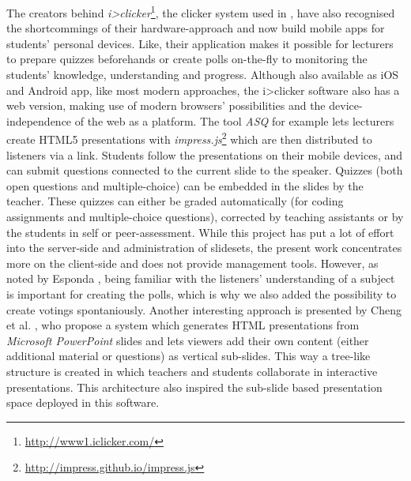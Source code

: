 The creators behind \emph{i>clicker}\footnote{\url{http://www1.iclicker.com/}}, the clicker system used in \cite{Chamillard:StudentResponseSystem}, have also recognised the shortcommings of their hardware-approach and now build mobile apps for students' personal devices. Like\cite{Esponda:ElectronicVotingOnTheFly}, their application makes it possible for lecturers to prepare quizzes beforehands or create polls on-the-fly to monitoring the students' knowledge, understanding and progress. Although also available as iOS and Android app, like most modern approaches, the i>clicker software also has a web version, making use of modern browsers' possibilities and the device-independence of the web as a platform.
The tool \emph{ASQ} \cite{Triglianos:InteractiveWebPresentationsImpress} for example lets lecturers create HTML5 presentations with \emph{impress.js}\footnote{\url{http://impress.github.io/impress.js}} which are then distributed to listeners via a link. Students follow the presentations on their mobile devices, and can submit questions connected to the current slide to the speaker. Quizzes (both open questions and multiple-choice) can be embedded in the slides by the teacher. These quizzes can either be graded automatically (for coding assignments and multiple-choice questions), corrected by teaching assistants or by the students in self or peer-assessment. While this project has put a lot of effort into the server-side and administration of slidesets, the present work concentrates more on the client-side and does not provide management tools. However, as noted by Esponda \cite{Esponda:ElectronicVotingOnTheFly}, being familiar with the listeners' understanding of a subject is important for creating the polls, which is why we also added the possibility to create votings spontaniously.
Another interesting approach is presented by Cheng et al. \cite{Cheng:TreebasedOnlinePresentations}, who propose a system which generates HTML presentations from \emph{Microsoft PowerPoint} slides and lets viewers add their own content (either additional material or questions) as vertical sub-slides. This way a tree-like structure is created in which teachers and students collaborate in interactive presentations. This architecture also inspired the sub-slide based presentation space deployed in this software.

